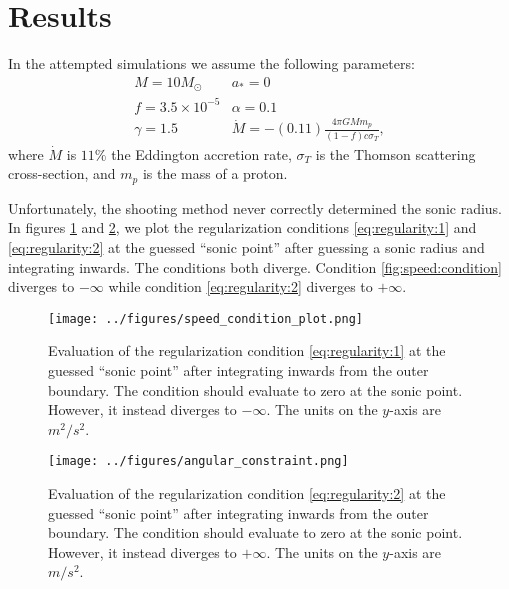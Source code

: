 \documentclass[]{article}
\begin{document}
\section{Results}
\label{sec:results}

In the attempted simulations we assume the following parameters:
\begin{eqnarray}
  \label{eq:choices}
  M = 10 M_{\odot} & a_* = 0 \nonumber\\
  f = 3.5\times 10^{-5} & \alpha = 0.1\\
  \gamma = 1.5&\dot{M} = -(0.11)\frac{4\pi G M m_p}{(1-f)c\sigma_T},\nonumber  
\end{eqnarray}
where $\dot{M}$ is $11\%$ the Eddington accretion rate, $\sigma_T$ is
the Thomson scattering cross-section, and $m_p$ is the mass of a
proton.

Unfortunately, the shooting method never correctly determined the
sonic radius. In figures \ref{fig:speed:condition} and
\ref{fig:angular:condition}, we plot the regularization conditions
\eqref{eq:regularity:1} and \eqref{eq:regularity:2} at the guessed
``sonic point'' after guessing a sonic radius and integrating
inwards. The conditions both diverge. Condition
\eqref{fig:speed:condition} diverges to $-\infty$ while condition
\eqref{eq:regularity:2} diverges to $+\infty$.

\begin{figure}[h!t!b!]
  \begin{center}
    \leavevmode
    \texttt{[image: ../figures/speed\_condition\_plot.png]}
    \caption[Constraints]{Evaluation of the regularization condition
      \eqref{eq:regularity:1} at the guessed ``sonic point'' after
      integrating inwards from the outer boundary. The condition
      should evaluate to zero at the sonic point. However, it instead
      diverges to $-\infty$. The units on the $y$-axis are $m^2/s^2$.}
    \label{fig:speed:condition}
  \end{center}
\end{figure}

\begin{figure}[h!t!b!]
  \begin{center}
    \leavevmode
    \texttt{[image: ../figures/angular\_constraint.png]}
    \caption[Constraints]{Evaluation of the regularization condition
      \eqref{eq:regularity:2} at the guessed ``sonic point'' after
      integrating inwards from the outer boundary. The condition
      should evaluate to zero at the sonic point. However, it instead
      diverges to $+\infty$. The units on the $y$-axis are $m/s^2$.}
    \label{fig:angular:condition}
  \end{center}
\end{figure}
\end{document}
